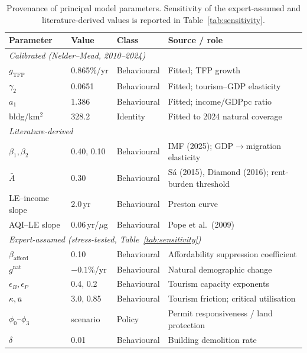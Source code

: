 \documentclass[urbansci,article,submit,pdftex,moreauthors]{Definitions/mdpi}
\begin{document}
\begin{table}[H]
\caption{Provenance of principal model parameters. Sensitivity of the
expert-assumed and literature-derived values is reported in
Table~\ref{tab:sensitivity}.}
\label{tab:provenance}
\begin{threeparttable}
\small
\begin{tabularx}{\textwidth}{lllX}
\toprule
\textbf{Parameter} & \textbf{Value} & \textbf{Class} & \textbf{Source / role} \\
\midrule
\multicolumn{4}{l}{\emph{Calibrated (Nelder--Mead, 2010--2024)}}\\
$g_\text{TFP}$         & 0.865\%/yr & Behavioural & Fitted; TFP growth \\
$\gamma_2$             & 0.0651     & Behavioural & Fitted; tourism--GDP elasticity \\
$a_1$                  & 1.386      & Behavioural & Fitted; income/GDPpc ratio \\
bldg/km$^2$            & 328.2      & Identity    & Fitted to 2024 natural coverage \\
\midrule
\multicolumn{4}{l}{\emph{Literature-derived}}\\
$\beta_1,\beta_2$      & 0.40, 0.10 & Behavioural & IMF (2025); GDP$\to$migration elasticity \\
$\bar A$               & 0.30       & Behavioural & Sá (2015), Diamond (2016); rent-burden threshold \\
LE--income slope       & 2.0\,yr    & Behavioural & Preston curve \\
AQI--LE slope          & 0.06\,yr/$\mu$g & Behavioural & Pope et al.\ (2009) \\
\midrule
\multicolumn{4}{l}{\emph{Expert-assumed (stress-tested, Table~\ref{tab:sensitivity})}}\\
$\beta_\text{afford}$  & 0.10       & Behavioural & Affordability suppression coefficient \\
$g^\text{nat}$         & $-0.1$\%/yr & Behavioural & Natural demographic change \\
$\epsilon_B,\epsilon_P$ & 0.4, 0.2  & Behavioural & Tourism capacity exponents \\
$\kappa,\bar u$        & 3.0, 0.85  & Behavioural & Tourism friction; critical utilisation \\
$\phi_0$--$\phi_3$     & scenario   & Policy      & Permit responsiveness / land protection \\
$\delta$               & 0.01       & Behavioural & Building demolition rate \\

\end{tabularx}
\end{threeparttable}
\end{table}
\end{document}

